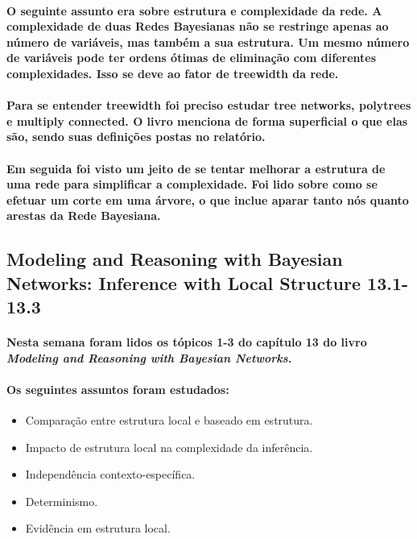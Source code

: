\documentclass[a4paper,10pt]{article}
\theoremstyle{plain}
\begin{document}
\paragraph{
  O seguinte assunto era sobre estrutura e complexidade da rede. A complexidade de duas Redes
  Bayesianas não se restringe apenas ao número de variáveis, mas também a sua estrutura. Um mesmo
  número de variáveis pode ter ordens ótimas de eliminação com diferentes complexidades. Isso se
  deve ao fator de treewidth da rede.
}

\paragraph{
  Para se entender treewidth foi preciso estudar tree networks, polytrees e multiply connected. O
  livro menciona de forma superficial o que elas são, sendo suas definições postas no relatório.
}

\paragraph{
  Em seguida foi visto um jeito de se tentar melhorar a estrutura de uma rede para simplificar a
  complexidade. Foi lido sobre como se efetuar um corte em uma árvore, o que inclue aparar tanto
  nós quanto arestas da Rede Bayesiana.
}

\subsection{Modeling and Reasoning with Bayesian Networks: Inference with Local Structure 13.1-13.3}

\paragraph{
  Nesta semana foram lidos os tópicos 1-3 do capítulo 13 do livro \textit{Modeling and Reasoning
  with Bayesian Networks}\cite{bayes-net-darwiche}.
}

\paragraph{
  Os seguintes assuntos foram estudados:
}

\begin{itemize}
  \item Comparação entre estrutura local e baseado em estrutura.
  \item Impacto de estrutura local na complexidade da inferência.
  \item Independência contexto-específica.
  \item Determinismo.
  \item Evidência em estrutura local.
\end{itemize}
\end{document}
